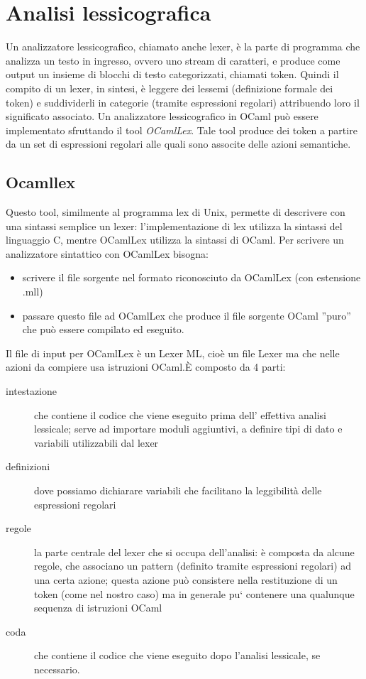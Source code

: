\documentclass[a4paper,10pt]{article}
\begin{document}
\section{Analisi lessicografica}
Un analizzatore lessicografico, chiamato anche lexer, \`e la parte di programma 
che analizza un testo in ingresso, ovvero uno stream di caratteri, e produce
come output un insieme di blocchi di testo categorizzati, chiamati token.
Quindi il compito di un lexer, in sintesi, \`e leggere dei lessemi (definizione
formale dei token) e suddividerli in categorie (tramite espressioni regolari)
attribuendo loro il significato associato.
Un analizzatore lessicografico in OCaml pu\`o essere implementato sfruttando il 
tool \textit{OCamlLex}.
Tale tool produce dei token a partire da un set di espressioni regolari alle 
quali sono associte delle azioni semantiche.


\subsection{Ocamllex}
Questo tool, similmente al programma lex di Unix, permette di descrivere con una
 sintassi semplice un lexer: l’implementazione di lex utilizza la sintassi del
linguaggio C, mentre OCamlLex utilizza la sintassi di OCaml. Per scrivere un
analizzatore sintattico con OCamlLex bisogna:

\begin{itemize}
\item scrivere il file sorgente nel formato riconosciuto da OCamlLex 
(con estensione .mll)
\item passare questo file ad OCamlLex che produce il file sorgente OCaml ”puro” 
che pu\`o essere compilato ed eseguito.
\end{itemize}

Il file di input per OCamlLex \`e un Lexer ML, cio\`e un file Lexer ma che nelle
 azioni da compiere usa istruzioni OCaml.\`E composto da 4 parti:
\begin{description}
\item [intestazione] che contiene il codice che viene eseguito prima
dell' effettiva analisi lessicale; serve ad importare moduli aggiuntivi, a
definire tipi di dato e variabili utilizzabili dal lexer
\item [definizioni] dove possiamo dichiarare variabili che facilitano la 
leggibilit\`a delle espressioni regolari
\item [regole] la parte centrale del lexer che si occupa dell’analisi: \`e 
composta da alcune regole, che associano un pattern (definito tramite
espressioni regolari) ad una certa azione; questa azione pu\`o consistere nella
restituzione di un token (come nel nostro caso) ma in generale pu` contenere una
qualunque sequenza di istruzioni OCaml
\item [coda] che contiene il codice che viene eseguito dopo l’analisi lessicale,
 se necessario.
\end{description}
\end{document}
